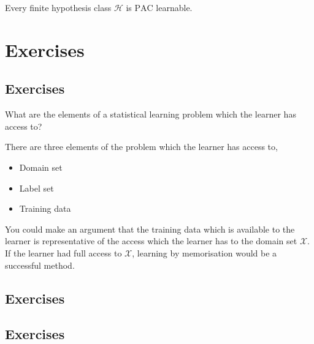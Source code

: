 \begin{proposition}
	Every finite hypothesis class $ \mathcal{H} $ is $ \mathrm{PAC} $ learnable.
\end{proposition}

\section{Exercises}
\subsection{Exercises \basic}
\begin{exercise}
	\begin{problem}
	What are the elements of a statistical learning problem which the learner has access to?
	\end{problem}
	\begin{solution}
		There are three elements of the problem which the learner has access to,
		\begin{itemize}
			\item Domain set
			\item Label set
			\item Training data
		\end{itemize}

		You could make an argument that the training data which is available to the learner is representative of the access which the learner has to the domain set $ \mathcal{X} $. If the learner had full access to $ \mathcal{X} $, learning by memorisation would be a successful method.
	\end{solution}
\end{exercise}

\subsection{Exercises \intermediate}
\subsection{Exercises \challenging}
